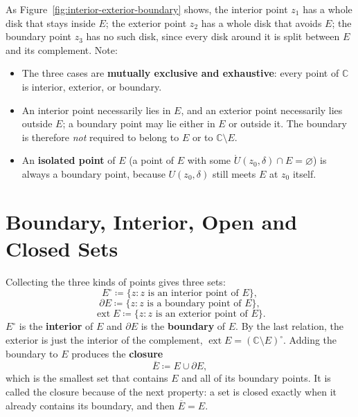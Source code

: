 \documentclass[11pt,a4paper]{article}
\theoremstyle{definition}
\theoremstyle{plain}
\begin{document}
As Figure~\ref{fig:interior-exterior-boundary} shows, the interior point $z_1$ has a whole disk that stays inside $E$; the exterior point $z_2$ has a whole disk that avoids $E$; the boundary point $z_3$ has no such disk, since every disk around it is split between $E$ and its complement. Note:
\begin{itemize}
    \item The three cases are \textbf{mutually exclusive and exhaustive}: every point of $\mathbb{C}$ is interior, exterior, or boundary.
    \item An interior point necessarily lies in $E$, and an exterior point necessarily lies outside $E$; a boundary point may lie either in $E$ or outside it. The boundary is therefore \textit{not} required to belong to $E$ or to $\mathbb{C} \setminus E$.
    \item An \textbf{isolated point} of $E$ (a point of $E$ with some $\mathring{U}(z_0, \delta) \cap E = \varnothing$) is always a boundary point, because $U(z_0, \delta)$ still meets $E$ at $z_0$ itself.
\end{itemize}

\section{Boundary, Interior, Open and Closed Sets}

Collecting the three kinds of points gives three sets:
\begin{equation}
E^{\circ} \coloneqq \{ z : z \text{ is an interior point of } E \},
\end{equation}
\begin{equation}
\partial E \coloneqq \{ z : z \text{ is a boundary point of } E \},
\end{equation}
\begin{equation}
\operatorname{ext} E \coloneqq \{ z : z \text{ is an exterior point of } E \}.
\end{equation}
$E^{\circ}$ is the \textbf{interior} of $E$ and $\partial E$ is the \textbf{boundary} of $E$. By the last relation, the exterior is just the interior of the complement, $\operatorname{ext} E = (\mathbb{C} \setminus E)^{\circ}$. Adding the boundary to $E$ produces the \textbf{closure}
\begin{equation}
\overline{E} \coloneqq E \cup \partial E,
\end{equation}
which is the smallest set that contains $E$ and all of its boundary points. It is called the closure because of the next property: a set is closed exactly when it already contains its boundary, and then $\overline{E} = E$.
\end{document}

